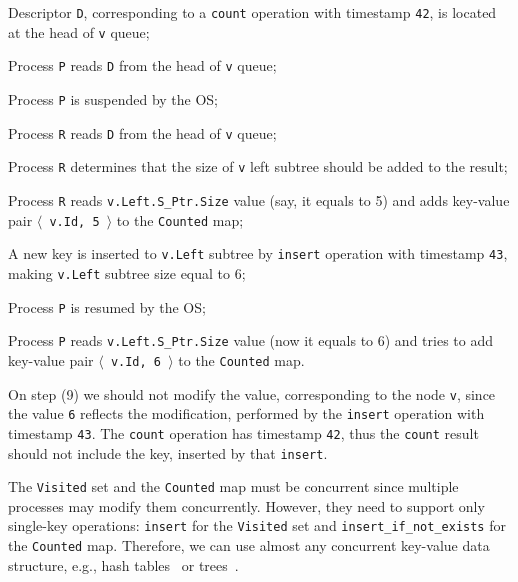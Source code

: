 \documentclass[times, dvipsnames,%
               languages={russian,english} %
              ]{itmo-student-thesis}
\begin{document}
\begin{nenum}
    \item Descriptor \texttt{D}, corresponding to a \texttt{count} operation with timestamp \texttt{42}, is located at the head of \texttt{v} queue;

    \item Process \texttt{P} reads \texttt{D} from the head of \texttt{v} queue;
    
    \item Process \texttt{P} is suspended by the OS;
    
    \item Process \texttt{R} reads \texttt{D} from the head of \texttt{v} queue;
    
    \item Process \texttt{R} determines that the size of \texttt{v} left subtree should be added to the result;
    
    \item Process \texttt{R} reads \texttt{v.Left.S\_Ptr.Size} value (say, it equals to 5) and adds key-value pair \texttt{$\langle$ v.Id, 5 $\rangle$} to the \texttt{Counted} map;
    
    \item A new key is inserted to \texttt{v.Left} subtree by \texttt{insert} operation with timestamp \texttt{43}, making \texttt{v.Left} subtree size equal to 6;
    
    \item Process \texttt{P} is resumed by the OS;
    
    \item Process \texttt{P} reads \texttt{v.Left.S\_Ptr.Size} value (now it equals to 6) and tries to add key-value pair \texttt{$\langle$ v.Id, 6 $\rangle$} to the \texttt{Counted} map.
\end{nenum}

\bigbreak

On step (9) we should not modify the value, corresponding to the node \texttt{v}, since the value \texttt{6} reflects the modification, performed by the \texttt{insert} operation with timestamp \texttt{43}. The \texttt{count} operation has timestamp \texttt{42}, thus the \texttt{count} result should not include the key, inserted by that \texttt{insert}.

The \texttt{Visited} set and the \texttt{Counted} map must be concurrent since multiple processes may modify them concurrently. However, they need to support only single-key operations: \texttt{insert} for the \texttt{Visited} set and \texttt{insert\_if\_not\_exists} for the \texttt{Counted} map. Therefore, we can use almost any concurrent key-value data structure, e.g., hash tables~\cite{gao2005lock,purcell2005non} or trees~\cite{natarajan2014fast,chatterjee2014efficient}.
\end{document}
